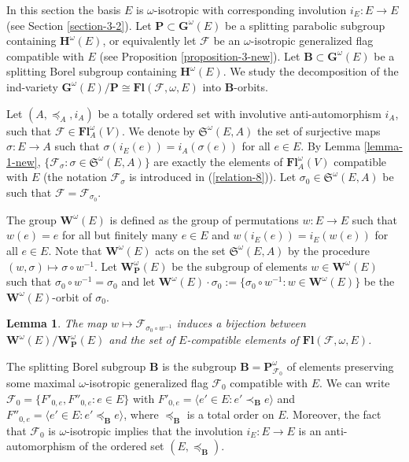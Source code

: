 \documentclass[12pt]{amsart}
\newtheorem{lemma}{Lemma}
\theoremstyle{definition}
\begin{document}
In this section the basis  $E$ is  $\omega$-isotropic with corresponding involution $i_E:E\to E$ (see Section \ref{section-3-2}).
Let $\mathbf{P}\subset\mathbf{G}^\omega(E)$ be a splitting parabolic subgroup containing $\mathbf{H}^\omega(E)$,
or equivalently let $\mathcal{F}$ be an $\omega$-isotropic generalized flag compatible with $E$ (see Proposition \ref{proposition-3-new}).
Let $\mathbf{B}\subset\mathbf{G}^\omega(E)$ be a splitting Borel subgroup containing $\mathbf{H}^\omega(E)$.
We study the decomposition of the ind-variety $\mathbf{G}^\omega(E)/\mathbf{P}\cong \mathbf{Fl}(\mathcal{F},\omega,E)$ into $\mathbf{B}$-orbits.

Let $(A,\preceq_A,i_A)$ be a totally ordered set with involutive anti-automorphism
$i_A$, such that $\mathcal{F}\in \mathbf{Fl}_A^\omega(V)$. We denote by $\mathfrak{S}^\omega(E,A)$ the set of surjective maps $\sigma:E\to A$ such that $\sigma(i_E(e))=i_A(\sigma(e))$ for all $e\in E$. By Lemma \ref{lemma-1-new}, $\{\mathcal{F}_\sigma:\sigma\in\mathfrak{S}^\omega(E,A)\}$ are exactly the elements of $\mathbf{Fl}_A^\omega(V)$ compatible with $E$
(the notation $\mathcal{F}_\sigma$ is introduced in (\ref{relation-8})).
Let $\sigma_0\in\mathfrak{S}^\omega(E,A)$ be such that $\mathcal{F}=\mathcal{F}_{\sigma_0}$.

The group $\mathbf{W}^\omega(E)$ is defined as the group of permutations $w:E\to E$ such that $w(e)=e$ for all but finitely many $e\in E$ and $w(i_E(e))=i_E(w(e))$ for all $e\in E$. Note that  $\mathbf{W}^\omega(E)$ acts on the set $\mathfrak{S}^\omega(E,A)$ by the procedure $(w,\sigma)\mapsto \sigma\circ w^{-1}$. Let $\mathbf{W}_\mathbf{P}^\omega(E)$ be the subgroup of elements $w\in\mathbf{W}^\omega(E)$ such that $\sigma_0\circ w^{-1}=\sigma_0$ and let $\mathbf{W}^\omega(E)\cdot \sigma_0:=\{\sigma_0\circ w^{-1}:w\in\mathbf{W}^\omega(E)\}$ be the $\mathbf{W}^\omega(E)$-orbit of $\sigma_0$.

\begin{lemma}
\label{lemma-3}
The map $w\mapsto \mathcal{F}_{\sigma_0\circ w^{-1}}$ induces a bijection between $\mathbf{W}^\omega(E)/\mathbf{W}_\mathbf{P}^\omega(E)$ and the set of $E$-compatible elements of $\mathbf{Fl}(\mathcal{F},\omega,E)$.
\end{lemma}

The splitting Borel subgroup $\mathbf{B}$ is the subgroup $\mathbf{B}=\mathbf{P}_{\mathcal{F}_0}^\omega$ of elements preserving some maximal $\omega$-isotropic generalized flag $\mathcal{F}_0$ compatible with $E$. We can write $\mathcal{F}_0=\{F'_{0,e},F''_{0,e}:e\in E\}$ with $F'_{0,e}=\langle e'\in E:e'\prec_\mathbf{B}e\rangle$
and $F''_{0,e}=\langle e'\in E:e'\preceq_\mathbf{B}e\rangle$, where $\preceq_\mathbf{B}$ is a total order on $E$. Moreover, the fact that $\mathcal{F}_0$ is $\omega$-isotropic implies that the involution $i_E:E\to E$ is an anti-automorphism of the ordered set $(E,\preceq_\mathbf{B})$.
\end{document}
